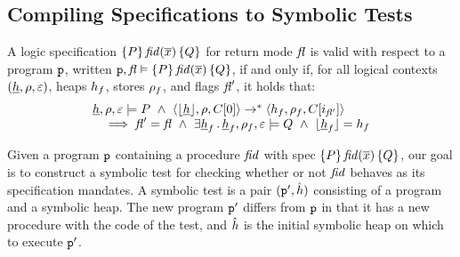 \newpage
\subsection{Compiling \jsil Specifications to Symbolic Tests}
\label{specs:to:symbolic:tests}

\begin{definition}
A \jsil logic specification $\{ P \} \, \mathit{fid}(\overline{x}) \,  \{ Q \}$ for return mode $\mathit{fl}$ is valid with respect to a program 
$\mathtt{p}$, written $\mathtt{p}, \mathit{fl} \vDash \{ P \} \, \mathit{fid}(\overline{x}) \,  \{ Q \}$,  if and only if, for all logical 
contexts $(\underline{h}, \rho, \varepsilon)$, heaps $h_f$, stores $\rho_f$, and flags $\mathit{fl}'$, it holds that: 
$$
\begin{array}{l}
    \iheap, \store, \senv \satisfies P \ \wedge \ \tuple{\deabstract{\iheap}, \store, \ctx[0]} \rightarrow^* \tuple{\heap_f, \store_f, \ctx[i_{\flag'}]} \\
       \quad \implies
            \flag' = \flag \ \wedge \ \exists \iheap_f \, . \, \iheap_f, \store_f, \senv \satisfies Q \ \wedge \ \deabstract{\iheap_f} = \heap_f
\end{array}
$$
\end{definition}

\noindent Given a \jsil program $\mathtt{p}$ containing a procedure $\mathit{fid}$ with spec {\small $\{ P \} \, \mathit{fid}(\overline{x}) \,  \{ Q \}$}, 
our goal is to construct a symbolic test for checking whether or not $\mathit{fid}$ behaves as its specification mandates.
A symbolic test is a pair $(\mathtt{p}', \hat{h})$ consisting of a \jsil program and a symbolic heap. The new program $\mathtt{p}'$ 
differs from $\mathtt{p}$ in that it has a new \jsilmain procedure with the code of the test, and $\hat{h}$ is the initial 
symbolic heap on which to execute $\mathtt{p}'$. 

